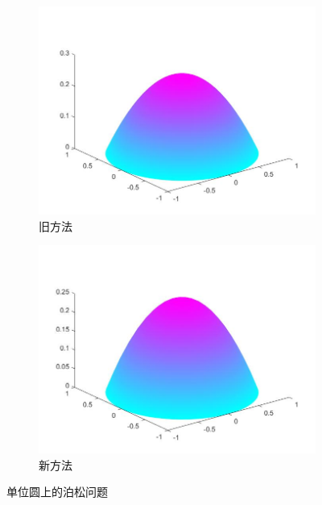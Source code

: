 \begin{figure}[H]
\begin{subfigure}[b]{0.4\textwidth}
                \end{subfigure}
                \begin{subfigure}[b]{0.4\textwidth}
                    \includegraphics[width=\textwidth]{images/PDE_example_oldmethod_jieguo.jpg}
                    \caption{旧方法}
                \end{subfigure}
                \begin{subfigure}[b]{0.4\textwidth}
                    \includegraphics[width=\textwidth]{images/PDE_example_newmethod_jieguo.jpg}
                    \caption{新方法}
                \end{subfigure}
                \caption{单位圆上的泊松问题}
                \label{单位圆上的泊松问题}
            \end{figure}

